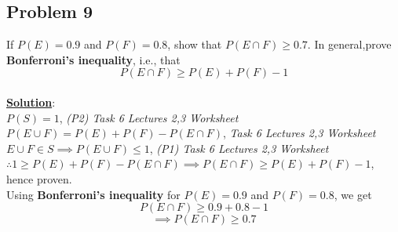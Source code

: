 \documentclass[11pt,letter paper]{report}
\begin{document}
\subsection*{Problem 9}
If $P(E)=0.9$ and $P(F)=0.8$, show that $P(E\cap F)\ge 0.7$. In general,prove {\bf Bonferroni's inequality}, i.e., that $$P(E\cap F)\ge P(E)+P(F)-1$$\\[0.1cm]
{\bf \underline{Solution}}:\\
$P(S)=1$, {\it(P2) Task 6 Lectures 2,3 Worksheet}\\
$P(E\cup F)=P(E)+P(F)-P(E\cap F)$, {\it Task 6 Lectures 2,3 Worksheet}\\
$E\cup F\in S\implies P(E\cup F)\le 1$, {\it(P1) Task 6 Lectures 2,3 Worksheet}\\
$\therefore 1\ge P(E)+P(F)-P(E\cap F)\implies P(E\cap F)\ge P(E)+P(F)-1$, hence proven.\\
Using {\bf Bonferroni's inequality} for $P(E)=0.9$ and $P(F)=0.8$, we get $$P(E\cap F)\ge 0.9+0.8-1$$
$$\implies P(E\cap F)\ge 0.7$$
\end{document}
